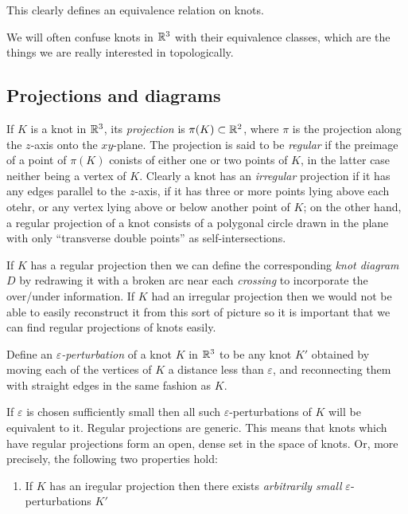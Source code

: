 This clearly defines an equivalence relation on knots.

We will often confuse knots in $\mathbb{R}^3$ with their equivalence classes,
which are the things we are really interested in topologically.


\subsection{Projections and diagrams}
\begin{definition}
  If $K$ is a knot in $\mathbb{R}^3$, its \emph{projection} is
  $\pi(K)\subset\mathbb{R}^2$, where $\pi$ is the projection along the $z$-axis
  onto the $xy$-plane. The projection is said to be \emph{regular} if the
  preimage of a point of $\pi(K)$ conists of either one or two points of
  $K$, in the latter case neither being a vertex of $K$. Clearly a knot has
  an \emph{irregular} projection if it has any edges parallel to the
  $z$-axis, if it has three or more points lying above each otehr, or any
  vertex lying above or below another point of $K$; on the other hand, a
  regular projection of a knot consists of a polygonal circle drawn in the
  plane with only ``transverse double points'' as self-intersections.
\end{definition}

\begin{definition}
  If $K$ has a regular projection then we can define the corresponding
  \emph{knot diagram} $D$ by redrawing it with a broken arc near each
  \emph{crossing} to incorporate the over/under information. If $K$ had an
  irregular projection then we would not be able to easily reconstruct it
  from this sort of picture so it is important that we can find regular
  projections of knots easily.
\end{definition}

\begin{definition}
  Define an \emph{$\varepsilon$-perturbation} of a knot $K$ in $\mathbb{R}^3$ to
  be any knot $K'$ obtained by moving each of the vertices of $K$ a
  distance less than $\varepsilon$, and reconnecting them with straight
  edges in the same fashion as $K$.
\end{definition}

If $\varepsilon$ is chosen sufficiently small then all such
$\varepsilon$-perturbations of $K$ will be equivalent to it. Regular
projections are generic. This means that knots which have regular
projections form an open, dense set in the space of knots. Or, more
precisely, the following two properties hold:
\begin{enumerate}[label=(\arabic*)]
\item If $K$ has an iregular projection then there exists \emph{arbitrarily
  small} $\varepsilon$-perturbations $K'$
\end{enumerate}


